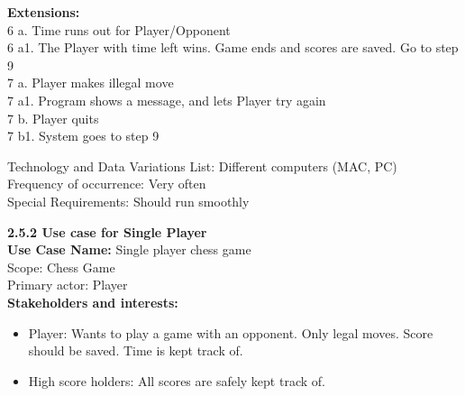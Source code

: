 \documentclass{article}
\begin{document}
\begin{flushleft}
\begin{enumerate}
\end{enumerate}
	
	\textbf{Extensions:} \\
	
\hspace{5mm} 6 a. Time runs out for Player/Opponent\\
\hspace{5mm} 6 a1. The Player with time left wins. Game ends and scores are saved. Go to step 9\\
\hspace{5mm} 7 a. Player makes illegal move\\
\hspace{5mm} 7 a1. Program shows a message, and lets Player try again\\
\hspace{5mm} 7 b. Player quits\\
\hspace{5mm} 7 b1. System goes to step 9\\
\vspace{3mm}

Technology and Data Variations List:\hspace{3mm} Different computers (MAC, PC)\\
Frequency of occurrence:\hspace{3mm} Very often\\
Special Requirements:\hspace{3mm} Should run smoothly\\
\vspace{10mm}

\textbf{2.5.2	Use case for Single Player}\\
\vspace{3mm}
\textbf {Use Case Name:} Single player chess game\\
\vspace{1mm}
Scope: Chess Game\\
\vspace{1mm}
Primary actor: Player\\
\vspace{1mm}
\textbf{Stakeholders and interests:}\\

\begin{itemize}	
	\item Player: Wants to play a game with an opponent. Only legal moves. Score should be saved. Time is kept track of.\\	
	\item High score holders: All scores are safely kept track of.	
\end{itemize}


\end{flushleft}
\end{document}
